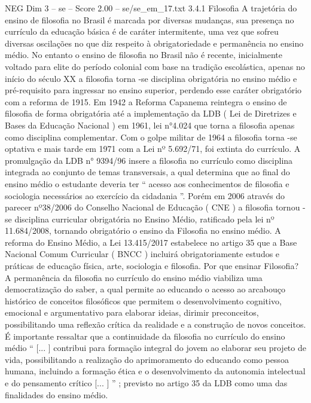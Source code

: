 \begin{textsample}{NEG Dim 3 – se – Score 2.00 – se/se\_em\_17.txt}  \label{ex:f3_neg_129}
3.4.1 Filosofia A trajetória do ensino de filosofia no Brasil é marcada por diversas mudanças, sua presença no currículo da educação básica é de caráter intermitente, uma vez que sofreu diversas oscilações no que diz respeito à obrigatoriedade e permanência no ensino médio.
No entanto o ensino de filosofia no Brasil não é recente, inicialmente voltado para elite do período colonial com base na tradição escolástica, apenas no início do século XX a filosofia torna -se disciplina obrigatória no ensino médio e pré-requisito para ingressar no ensino superior, perdendo esse caráter obrigatório com a reforma de 1915.
Em 1942 a Reforma Capanema reintegra o ensino de filosofia de forma obrigatória até a implementação da LDB ( Lei de Diretrizes e Bases da Educação Nacional ) em 1961, lei n{\EmojiFont °}4.024 que torna a filosofia apenas como disciplina complementar.
Com o golpe militar de 1964 a filosofia torna -se optativa e mais tarde em 1971 com a Lei nº 5.692/71, foi extinta do currículo.
A promulgação da LDB n{\EmojiFont °} 9394/96 insere a filosofia no currículo como disciplina integrada ao conjunto de temas transversais, a qual determina que ao final do ensino médio o estudante deveria ter “ acesso aos conhecimentos de filosofia e sociologia necessários ao exercício da cidadania ”.
Porém em 2006 através do parecer nº38/2006 do Conselho Nacional de Educação ( CNE ) a filosofia tornou -se disciplina curricular obrigatória no Ensino Médio, ratificado pela lei nº 11.684/2008, tornando obrigatório o ensino da Filosofia no ensino médio.
A reforma do Ensino Médio, a Lei 13.415/2017 estabelece no artigo 35 que a Base Nacional Comum Curricular ( BNCC ) incluirá obrigatoriamente estudos e práticas de educação física, arte, sociologia e filosofia.
Por que ensinar Filosofia?
A permanência da filosofia no currículo do ensino médio viabiliza uma democratização do saber, a qual permite ao educando o acesso ao arcabouço histórico de conceitos filosóficos que permitem o desenvolvimento cognitivo, emocional e argumentativo para elaborar ideias, dirimir preconceitos, possibilitando uma reflexão crítica da realidade e a construção de novos conceitos.
É importante ressaltar que a continuidade da filosofia no currículo do ensino médio “ [... ] contribui para formação integral do jovem ao elaborar seu projeto de vida, possibilitando a realização do aprimoramento do educando como pessoa humana, incluindo a formação ética e o desenvolvimento da autonomia intelectual e do pensamento crítico [... ] ” ; previsto no artigo 35 da LDB como uma das finalidades do ensino médio.

\end{textsample}
